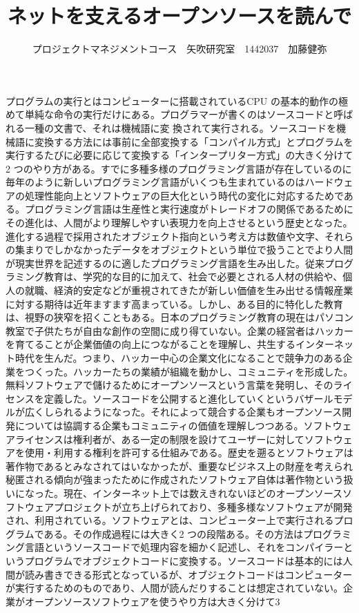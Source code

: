 \documentclass[uplatex,twocolumn,dvipdfmx]{jsarticle}
\title{\vspace{-5mm}\fontsize{14pt}{0pt}\selectfont ネットを支えるオープンソースを読んで}
\author{\normalsize プロジェクトマネジメントコース　矢吹研究室　1442037　加藤健弥}
\date{}
\begin{document}
\fontsize{10.5pt}{\baselineskip}\selectfont
\maketitle
プログラムの実行とはコンピューターに搭載されているCPU の基本的動作の極めて単純な命令の実行だけにある。プログラマーが書くのはソースコードと呼ばれる一種の文書で、それは機械語に変
換されて実行される。ソースコードを機械語に変換する方法には事前に全部変換する「コンパイル方式」とプログラムを実行するたびに必要に応じて変換する「インタープリター方式」の大きく分けて2 つのやり方がある。すでに多種多様のプログラミング言語が存在しているのに毎年のように新しいプログラミング言語がいくつも生まれているのはハードウェアの処理性能向上とソフトウェアの巨大化という時代の変化に対応するためである。プログラミング言語は生産性と実行速度がトレードオフの関係であるためにその進化は、人間がより理解しやすい表現力を向上させるという歴史となった。進化する過程で採用されたオブジェクト指向という考え方は数値や文字、それらの集まりでしかなかったデータをオブジェクトという単位で扱うことでより人間が現実世界を記述するのに適したプログラミング言語を生み出した。従来プログラミング教育は、学究的な目的に加えて、社会で必要とされる人材の供給や、個人の就職、経済的安定などが重視されてきたが新しい価値を生み出せる情報産業に対する期待は近年ますます高まっている。しかし、ある目的に特化した教育は、視野の狭窄を招くこともある。日本のプログラミング教育の現在はパソコン教室で子供たちが自由な創作の空間に成り得ていない。企業の経営者はハッカーを育てることが企業価値の向上につながることを理解し、共生するインターネット時代を生んだ。つまり、ハッカー中心の企業文化になることで競争力のある企業をつくった。ハッカーたちの業績が組織を動かし、コミュニティを形成した。無料ソフトウェアで儲けるためにオープンソースという言葉を発明し、そのライセンスを定義した。ソースコードを公開すると進化していくというバザールモデルが広くしられるようになった。それによって競合する企業もオープンソース開発については協調する企業もコミュニティの価値を理解しつつある。ソフトウェアライセンスは権利者が、ある一定の制限を設けてユーザーに対してソフトウェアを使用・利用する権利を許可する仕組みである。歴史を遡るとソフトウェアは著作物であるとみなされてはいなかったが、重要なビジネス上の財産を考えられ秘匿される傾向が強まったために作成されたソフトウェア自体は著作物という扱いになった。現在、インターネット上では数えきれないほどのオープンソースソフトウェアプロジェクトが立ち上げられており、多種多様なソフトウェアが開発され、利用されている。ソフトウェアとは、コンピューター上で実行されるプログラムである。その作成過程には大きく2 つの段階ある。その方法はプログラミング言語というソースコードで処理内容を細かく記述し、それをコンパイラーというプログラムでオブジェクトコードに変換する。ソースコードは基本的には人間が読み書きできる形式となっているが、オブジェクトコードはコンピューターが実行するためのものであり、人間が読んだりすることは想定されていない。企業がオープンソースソフトウェアを使うやり方は大きく分けて3 
\end{document}
